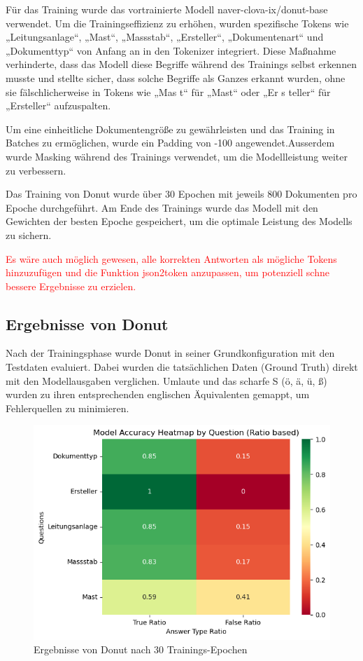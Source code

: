 \documentclass[12pt,a4paper,twoside]{article}
\newcommand\myworries[1]{\textcolor{red}{#1}}
\begin{document}
Für das Training wurde das vortrainierte Modell naver-clova-ix/donut-base \cite{DONUT-donut-base} verwendet. Um die Trainingseffizienz zu erhöhen, wurden spezifische Tokens wie „Leitungsanlage“, „Mast“, „Massstab“, „Ersteller“, „Dokumentenart“ und „Dokumenttyp“ von Anfang an in den Tokenizer integriert. Diese Maßnahme verhinderte, dass das Modell diese Begriffe während des Trainings selbst erkennen musste und stellte sicher, dass solche Begriffe als Ganzes erkannt wurden, ohne sie fälschlicherweise in Tokens wie „Mas t“ für „Mast“ oder „Er s teller“ für „Ersteller“ aufzuspalten.

Um eine einheitliche Dokumentengröße zu gewährleisten und das Training in Batches zu ermöglichen, wurde ein Padding von -100 angewendet.Ausserdem wurde Masking während des Trainings verwendet, um die Modellleistung weiter zu verbessern.

Das Training von Donut wurde über 30 Epochen mit jeweils 800 Dokumenten pro Epoche durchgeführt. Am Ende des Trainings wurde das Modell mit den Gewichten der besten Epoche gespeichert, um die optimale Leistung des Modells zu sichern.

\myworries{Es wäre auch möglich gewesen, alle korrekten Antworten als mögliche Tokens hinzuzufügen und die Funktion json2token anzupassen, um potenziell schne bessere Ergebnisse zu erzielen.}

\subsection{Ergebnisse von Donut}
Nach der Trainingsphase wurde Donut in seiner Grundkonfiguration mit den Testdaten evaluiert. Dabei wurden die tatsächlichen Daten (Ground Truth) direkt mit den Modellausgaben verglichen. Umlaute und das scharfe S (ö, ä, ü, ß) wurden zu ihren entsprechenden englischen Äquivalenten gemappt, um Fehlerquellen zu minimieren.

\begin{figure}[H]
    \centering
    \includegraphics[width=0.5\linewidth]{DONUT-Transformer-results.png}
    \caption{Ergebnisse von Donut nach 30 Trainings-Epochen}
    \label{fig:enter-label}
\end{figure}
\end{document}
